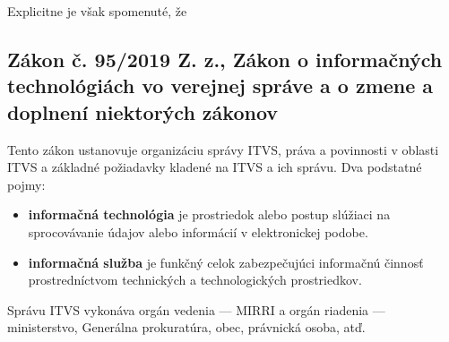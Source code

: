 Explicitne je však spomenuté, že 

\subsection{Zákon č. 95/2019 Z. z., Zákon o informačných technológiách vo verejnej správe a o zmene a doplnení niektorých zákonov \cite{95/2019}}
Tento zákon ustanovuje organizáciu správy ITVS, práva a povinnosti v oblasti ITVS a základné požiadavky kladené na ITVS a ich správu. Dva podstatné pojmy:

\begin{itemize}
  \item \textbf{informačná technológia} je prostriedok alebo postup slúžiaci na sprocovávanie údajov alebo informácií v elektronickej podobe.
  \item \textbf{informačná služba} je funkčný celok zabezpečujúci informačnú činnosť prostredníctvom technických a technologických prostriedkov.
\end{itemize}

Správu ITVS vykonáva orgán vedenia --- MIRRI a orgán riadenia --- ministerstvo, Generálna prokuratúra, obec, právnická osoba, atď.
